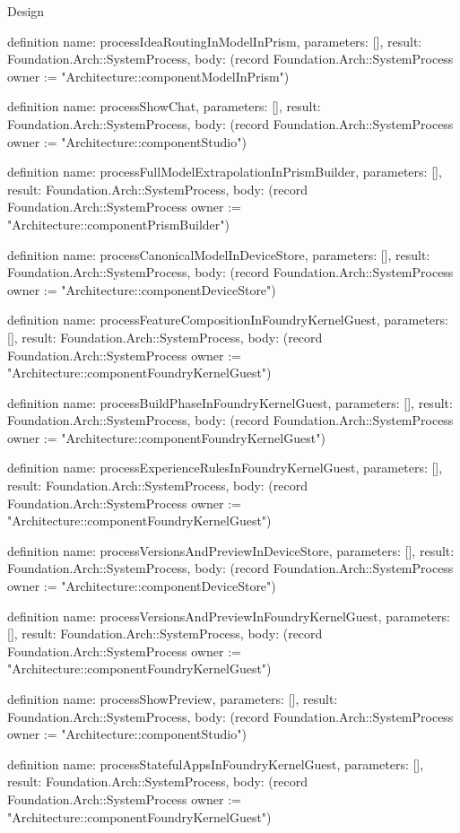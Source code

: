 \begin{lexlean}{Design}
\begin{semanticmodule}
definition{
  name: processIdeaRoutingInModelInPrism,
  parameters: [],
  result: Foundation.Arch::SystemProcess,
  body: (record Foundation.Arch::SystemProcess {owner := "Architecture::componentModelInPrism"})
}

definition{
  name: processShowChat,
  parameters: [],
  result: Foundation.Arch::SystemProcess,
  body: (record Foundation.Arch::SystemProcess {owner := "Architecture::componentStudio"})
}

definition{
  name: processFullModelExtrapolationInPrismBuilder,
  parameters: [],
  result: Foundation.Arch::SystemProcess,
  body: (record Foundation.Arch::SystemProcess {owner := "Architecture::componentPrismBuilder"})
}

definition{
  name: processCanonicalModelInDeviceStore,
  parameters: [],
  result: Foundation.Arch::SystemProcess,
  body: (record Foundation.Arch::SystemProcess {owner := "Architecture::componentDeviceStore"})
}

definition{
  name: processFeatureCompositionInFoundryKernelGuest,
  parameters: [],
  result: Foundation.Arch::SystemProcess,
  body: (record Foundation.Arch::SystemProcess {owner := "Architecture::componentFoundryKernelGuest"})
}

definition{
  name: processBuildPhaseInFoundryKernelGuest,
  parameters: [],
  result: Foundation.Arch::SystemProcess,
  body: (record Foundation.Arch::SystemProcess {owner := "Architecture::componentFoundryKernelGuest"})
}

definition{
  name: processExperienceRulesInFoundryKernelGuest,
  parameters: [],
  result: Foundation.Arch::SystemProcess,
  body: (record Foundation.Arch::SystemProcess {owner := "Architecture::componentFoundryKernelGuest"})
}

definition{
  name: processVersionsAndPreviewInDeviceStore,
  parameters: [],
  result: Foundation.Arch::SystemProcess,
  body: (record Foundation.Arch::SystemProcess {owner := "Architecture::componentDeviceStore"})
}

definition{
  name: processVersionsAndPreviewInFoundryKernelGuest,
  parameters: [],
  result: Foundation.Arch::SystemProcess,
  body: (record Foundation.Arch::SystemProcess {owner := "Architecture::componentFoundryKernelGuest"})
}

definition{
  name: processShowPreview,
  parameters: [],
  result: Foundation.Arch::SystemProcess,
  body: (record Foundation.Arch::SystemProcess {owner := "Architecture::componentStudio"})
}

definition{
  name: processStatefulAppsInFoundryKernelGuest,
  parameters: [],
  result: Foundation.Arch::SystemProcess,
  body: (record Foundation.Arch::SystemProcess {owner := "Architecture::componentFoundryKernelGuest"})
}


\end{semanticmodule}
\end{lexlean}
